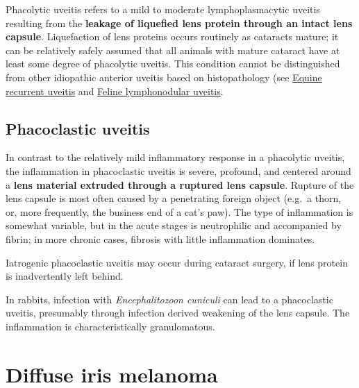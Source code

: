 \documentclass[openany]{book}
\begin{document}
Phacolytic uveitis refers to a mild to moderate lymphoplasmacytic
uveitis resulting from the \textbf{leakage of liquefied lens protein
through an intact lens capsule}. Liquefaction of lens proteins occurs
routinely as cataracts mature; it can be relatively safely assumed that
all animals with mature cataract have at least some degree of phacolytic
uveitis. This condition cannot be distinguished from other idiopathic
anterior uveitis based on histopathology (see
\protect\hyperlink{equine-recurrent-uveitis}{Equine recurrent uveitis}
and \protect\hyperlink{feline-lymphonodular-uveitis}{Feline
lymphonodular uveitis}.

\subsection{Phacoclastic uveitis}\label{phacoclastic-uveitis}

In contrast to the relatively mild inflammatory response in a phacolytic
uveitis, the inflammation in phacoclastic uveitis is severe, profound,
and centered around a \textbf{lens material extruded through a ruptured
lens capsule}. Rupture of the lens capsule is most often caused by a
penetrating foreign object (e.g.~a thorn, or, more frequently, the
business end of a cat's paw). The type of inflammation is somewhat
variable, but in the acute stages is neutrophilic and accompanied by
fibrin; in more chronic cases, fibrosis with little inflammation
dominates.

Iatrogenic phacoclastic uveitis may occur during cataract surgery, if
lens protein is inadvertently left behind.

In rabbits, infection with \emph{Encephalitozoon cuniculi} can lead to a
phacoclastic uveitis, presumably through infection derived weakening of
the lens capsule. The inflammation is characteristically granulomatous.

\hypertarget{diffuse-iris-melanoma}{\section{Diffuse iris
melanoma}\label{diffuse-iris-melanoma}}
\end{document}

